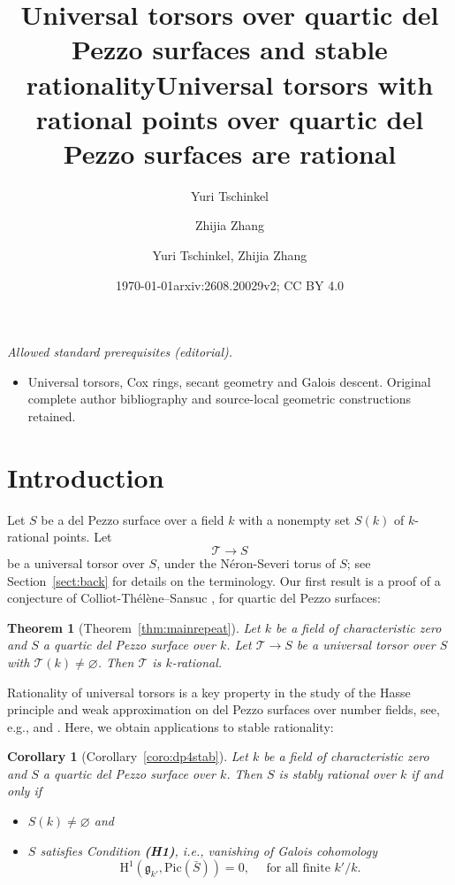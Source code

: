 \documentclass[12pt, reqno]{amsart}
\title[Universal torsor and stable rationality]{Universal torsors over quartic del Pezzo surfaces and stable rationality}
\author[Yuri Tschinkel]{Yuri Tschinkel}
\author[Zhijia Zhang]{Zhijia Zhang}
\date{\today}
\title{Universal torsors with rational points over quartic del Pezzo surfaces are rational}
\author{Yuri Tschinkel, Zhijia Zhang}
\date{arxiv:2608.20029v2; CC BY 4.0}
\theoremstyle{plain}
\newtheorem{theo}[prop]{Theorem}
\newtheorem{coro}[prop]{Corollary}
\theoremstyle{remark}
\theoremstyle{definition}
\numberwithin{equation}{section}
\def\cT{{\mathcal T}}
\def\rH{{\mathrm H}}
\def\Pic{\mathrm{Pic}}
\begin{document}
\maketitle
\noindent\textit{Allowed standard prerequisites (editorial).}\begin{itemize}
\item Universal torsors, Cox rings, secant geometry and Galois descent. Original complete author bibliography and source-local geometric constructions retained.
\end{itemize}\medskip
    \section{Introduction}
	\label{sect:intro}


Let $S$ be a del Pezzo surface over a field $k$ with a nonempty set 
$S(k)$ of $k$-rational points. 
Let 
$$
\cT\to S
$$
be a universal torsor over $S$, under the N\'eron-Severi torus of $S$; see Section~\ref{sect:back} for details on the terminology. 
Our first result is a proof of a conjecture of Colliot-Th\'el\`ene--Sansuc \cite[Section 2.8]{CTSansucDuke}, for quartic del Pezzo surfaces: 


\begin{theo}[Theorem~\ref{thm:mainrepeat}]
\label{thm:main}
Let $k$ be a field of characteristic zero and $S$ a quartic del Pezzo surface over $k$. Let $\cT\to S$ be a universal torsor over $S$ with $\cT(k)\neq \varnothing$. Then $\cT$ is $k$-rational.
\end{theo}


Rationality of universal torsors is a key property in the study of 
the Hasse principle and weak approximation on
del Pezzo surfaces over number fields, see, e.g., \cite{CTSansucDuke} and \cite{Salberger}. 
Here, we obtain applications to stable rationality:


\begin{coro}[Corollary~\ref{coro:dp4stab}]
\label{coro:stable}
Let $k$ be a field of characteristic zero and $S$ a quartic del Pezzo surface over $k$. 
Then $S$ is stably rational over $k$ if and only if 
\begin{itemize}
    \item $S(k)\neq \varnothing$ and
    \item $S$ satisfies Condition {\bf (H1)}, i.e., vanishing of Galois cohomology
    \begin{equation} 
    \label{eqn:h1}
\rH^1(\mathfrak g_{k'}, \Pic(\bar{S}))=0, \quad \text{ for all finite }  k'/k. 
    \end{equation}
\end{itemize}
\end{coro}
\end{document}
